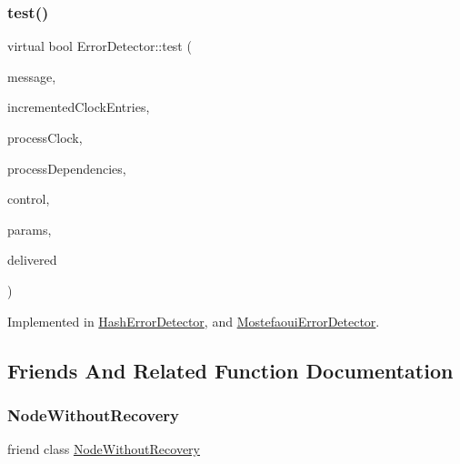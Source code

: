 \subsubsection{\texorpdfstring{test()}{test()}}
{\footnotesize\ttfamily virtual bool Error\+Detector\+::test (\begin{DoxyParamCaption}\item[{\hyperlink{structures_8h_a7e7bdc1d2fff8a9436f2f352b2711ed6}{message\+Info}}]{message,  }\item[{const vector$<$ unsigned int $>$ \&}]{incremented\+Clock\+Entries,  }\item[{const \hyperlink{classProbabilisticClock}{Probabilistic\+Clock} \&}]{process\+Clock,  }\item[{const \hyperlink{classTotalDependencies}{Total\+Dependencies} \&}]{process\+Dependencies,  }\item[{\hyperlink{classController}{Controller} $\ast$}]{control,  }\item[{\hyperlink{classSimulationParameters}{Simulation\+Parameters} $\ast$}]{params,  }\item[{const vector$<$ \hyperlink{structures_8h_a7e7bdc1d2fff8a9436f2f352b2711ed6}{message\+Info} $>$ \&}]{delivered }\end{DoxyParamCaption})\hspace{0.3cm}{\ttfamily [pure virtual]}}



Implemented in \hyperlink{classHashErrorDetector_a1c7fe649a34cf7e139ce53a248dce748}{Hash\+Error\+Detector}, and \hyperlink{classMostefaouiErrorDetector_a293f6cf144526bc8694fc4f1fc0daeb5}{Mostefaoui\+Error\+Detector}.



\subsection{Friends And Related Function Documentation}
\mbox{\label{classErrorDetector_aa0495b79e94b09962892b921ae370e57}} 
\subsubsection{\texorpdfstring{Node\+Without\+Recovery}{NodeWithoutRecovery}}
{\footnotesize\ttfamily friend class \hyperlink{classNodeWithoutRecovery}{Node\+Without\+Recovery}\hspace{0.3cm}{\ttfamily [friend]}}

